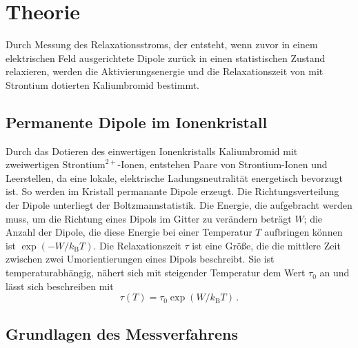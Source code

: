 \section{Theorie}

Durch Messung des Relaxationsstroms, der entsteht, wenn zuvor in einem elektrischen Feld ausgerichtete Dipole zurück in einen statistischen Zustand relaxieren, werden die Aktivierungsenergie und die Relaxationszeit von mit Strontium dotierten Kaliumbromid bestimmt.

\subsection{Permanente Dipole im Ionenkristall}

Durch das Dotieren des einwertigen Ionenkristalls Kaliumbromid mit zweiwertigen $\text{Strontium}^{2+}$-Ionen, entstehen Paare von Strontium-Ionen und Leerstellen, da eine lokale, elektrische Ladungsneutralität energetisch bevorzugt ist. So werden im Kristall permanante Dipole erzeugt. Die Richtungsverteilung der Dipole unterliegt der Boltzmannstatistik. Die Energie, die aufgebracht werden muss, um die Richtung eines Dipols im Gitter zu verändern beträgt $W$; die Anzahl der Dipole, die diese Energie bei einer Temperatur $T$ aufbringen können ist $\exp \left( -W/k_\text{B}T \right)$. Die Relaxationszeit $\tau$ ist eine Größe, die die mittlere Zeit zwischen zwei Umorientierungen eines Dipols beschreibt. Sie ist temperaturabhängig, nähert sich mit steigender Temperatur dem Wert $\tau_0$ an und lässt sich beschreiben mit
\begin{equation}
  \tau(T) = \tau_0 \exp \left( W/k_\text{B}T \right)\,.
  \label{eq:tau}
\end{equation}

\subsection{Grundlagen des Messverfahrens}

